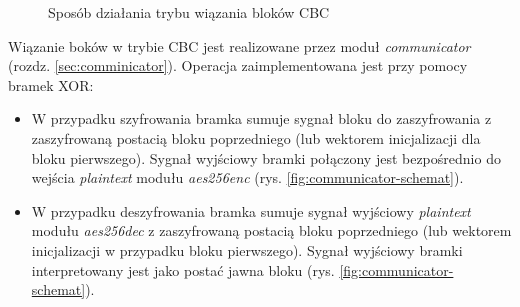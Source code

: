 \begin{figure}[!h]
\centering
{}
\newline
{}
\caption{Sposób działania trybu wiązania bloków CBC \cite{cbc}}
\label{fig:cbc}
\end{figure}

Wiązanie boków w trybie CBC jest realizowane przez moduł \textit{communicator} (rozdz. \ref{sec:comminicator}). Operacja zaimplementowana jest przy pomocy bramek XOR:
\begin{itemize}
\item W przypadku szyfrowania bramka sumuje sygnał bloku do zaszyfrowania z zaszyfrowaną postacią bloku poprzedniego (lub wektorem inicjalizacji dla bloku pierwszego). Sygnał wyjściowy bramki połączony jest bezpośrednio do wejścia \textit{plaintext} modułu \textit{aes256enc} (rys. \ref{fig:communicator-schemat}).
\item W przypadku deszyfrowania bramka sumuje sygnał wyjściowy \textit{plaintext} modułu \textit{aes256dec} z zaszyfrowaną postacią bloku poprzedniego (lub wektorem inicjalizacji w przypadku bloku pierwszego). Sygnał wyjściowy bramki interpretowany jest jako postać jawna bloku (rys. \ref{fig:communicator-schemat}).
\end{itemize}